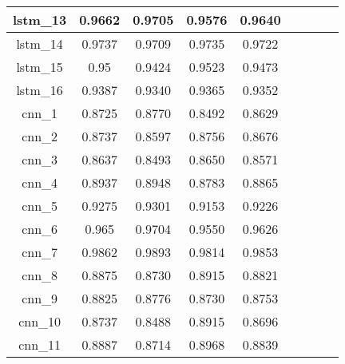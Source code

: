 \begin{table}[h]
\begin{tabular} {|c|c|c|c|c|c|c|c|c| }
        lstm\_13 & 0.9662                       & 0.9705    & 0.9576 & 0.9640 \\ \hline
        lstm\_14 & 0.9737                       & 0.9709    & 0.9735 & 0.9722 \\ \hline
        lstm\_15 & 0.95                         & 0.9424    & 0.9523 & 0.9473 \\ \hline
        lstm\_16 & 0.9387                       & 0.9340    & 0.9365 & 0.9352 \\ \hline
        cnn\_1   & 0.8725                       & 0.8770    & 0.8492 & 0.8629 \\ \hline
        cnn\_2   & 0.8737                       & 0.8597    & 0.8756 & 0.8676 \\ \hline
        cnn\_3   & 0.8637                       & 0.8493    & 0.8650 & 0.8571 \\ \hline
        cnn\_4   & 0.8937                       & 0.8948    & 0.8783 & 0.8865 \\ \hline
        cnn\_5   & 0.9275                       & 0.9301    & 0.9153 & 0.9226 \\ \hline
        cnn\_6   & 0.965                        & 0.9704    & 0.9550 & 0.9626 \\ \hline
        cnn\_7   & 0.9862                       & 0.9893    & 0.9814 & 0.9853 \\ \hline
        cnn\_8   & 0.8875                       & 0.8730    & 0.8915 & 0.8821 \\ \hline
        cnn\_9   & 0.8825                       & 0.8776    & 0.8730 & 0.8753 \\ \hline
        cnn\_10  & 0.8737                       & 0.8488    & 0.8915 & 0.8696 \\ \hline
        cnn\_11  & 0.8887                       & 0.8714    & 0.8968 & 0.8839 \\ \hline
    \end{tabular}
\end{table}


